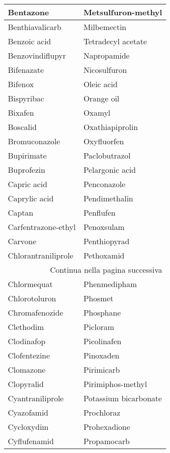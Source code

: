 \begin{small}
\begin{longtable}{|l|l|}
        Bentazone & Metsulfuron-methyl \\ \hline
        Benthiavalicarb & Milbemectin \\ \hline
        Benzoic acid & Tetradecyl acetate \\ \hline
        Benzovindiflupyr & Napropamide \\ \hline
        Bifenazate & Nicosulfuron \\ \hline
        Bifenox & Oleic acid \\ \hline
        Bispyribac & Orange oil \\ \hline
        Bixafen & Oxamyl \\ \hline
        Boscalid & Oxathiapiprolin \\ \hline
        Bromuconazole & Oxyfluorfen \\ \hline
        Bupirimate & Paclobutrazol \\ \hline
        Buprofezin & Pelargonic acid \\ \hline
        Capric acid & Penconazole \\ \hline
        Caprylic acid & Pendimethalin \\ \hline
        Captan & Penflufen \\ \hline
        Carfentrazone-ethyl & Penoxsulam \\ \hline
        Carvone & Penthiopyrad \\ \hline
        Chlorantraniliprole & Pethoxamid \\ \hline
        \multicolumn{2}{|r|}{{Continua nella pagina successiva}} \\ \hline
        Chlormequat & Phenmedipham \\ \hline
        Chlorotoluron & Phosmet \\ \hline
        Chromafenozide & Phosphane \\ \hline
        Clethodim & Picloram \\ \hline
        Clodinafop & Picolinafen \\ \hline
        Clofentezine & Pinoxaden \\ \hline
        Clomazone & Pirimicarb \\ \hline
        Clopyralid & Pirimiphos-methyl \\ \hline
        Cyantraniliprole & Potassium bicarbonate \\ \hline
        Cyazofamid & Prochloraz \\ \hline
        Cycloxydim & Prohexadione \\ \hline
        Cyflufenamid & Propamocarb \\ \hline

\end{longtable}
\end{small}
